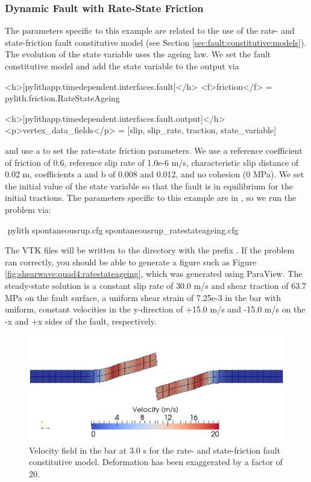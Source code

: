 \subsubsection{Dynamic Fault with Rate-State Friction}

The parameters specific to this example are related to the use of
the rate- and state-friction fault constitutive model (see Section
\vref{sec:fault:constitutive:models}). The evolution of the state
variable uses the ageing law. We set the fault constitutive model
and add the state variable to the output via
\begin{cfg}
<h>[pylithapp.timedependent.interfaces.fault]</h>
<f>friction</f> = pylith.friction.RateStateAgeing 

<h>[pylithapp.timedependent.interfaces.fault.output]</h>
<p>vertex_data_fields</p> = [slip, slip_rate, traction, state_variable]
\end{cfg}
and use a  to set the rate-state friction parameters. We
use a reference coefficient of friction of 0.6, reference slip rate
of 1.0e-6 m/s, characteristic slip distance of 0.02 m, coefficients
a and b of 0.008 and 0.012, and no cohesion (0 MPa). We set the initial
value of the state variable so that the fault is in equilibrium for
the initial tractions. The parameters specific to this example are
in , so we run the problem
via:
\begin{shell}
$$ pylith spontaneousrup.cfg spontaneousrup_ratestateageing.cfg
\end{shell}
The VTK files will be written to the  directory with
the prefix . If the problem ran correctly,
you should be able to generate a figure such as Figure
\vref{fig:shearwave:quad4:ratestateageing}, which was generated using
ParaView. The steady-state solution is a constant slip rate of 30.0
m/s and shear traction of 63.7 MPa on the fault surface, a uniform
shear strain of 7.25e-3 in the bar with uniform, constant velocities
in the y-direction of +15.0 m/s and -15.0 m/s on the -x and +x sides
of the fault, respectively.

\begin{figure}
  \includegraphics[scale=0.5]{examples/figs/shearwave_quad4ratestateageing30}
  \caption{Velocity field in the bar at 3.0 s for the rate- and state-friction
    fault constitutive model. Deformation has been exaggerated by a factor
    of 20.}
  \label{fig:shearwave:quad4:ratestateageing}
\end{figure}


